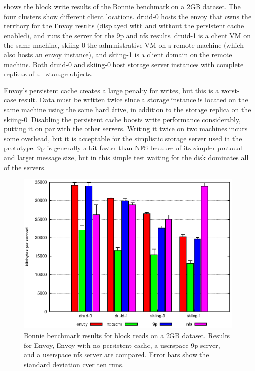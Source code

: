  shows the block write results of the Bonnie benchmark on a 2GB dataset. The four clusters show different client locations. druid-0 hosts the envoy that owns the territory for the Envoy results (displayed with and without the persistent cache enabled), and runs the server for the 9p and nfs results. druid-1 is a client VM on the same machine, skiing-0 the administrative VM on a remote machine (which also hosts an envoy instance), and skiing-1 is a client domain on the remote machine. Both druid-0 and skiing-0 host storage server instances with complete replicas of all storage objects.

Envoy's persistent cache creates a large penalty for writes, but this is a worst-case result. Data must be written twice since a storage instance is located on the same machine using the same hard drive, in addition to the storage replica on the skiing-0. Disabling the persistent cache boosts write performance considerably, putting it on par with the other servers. Writing it twice on two machines incurs some overhead, but it is acceptable for the simplistic storage server used in the prototype. 9p is generally a bit faster than NFS because of its simpler protocol and larger message size, but in this simple test waiting for the disk dominates all of the servers.

\begin{figure}[t]
\centering
\includegraphics[width=\figwidth]{figures/bonnie-read}
\caption[Bonnie benchmark results for block reads]{Bonnie benchmark results for block reads on a 2GB dataset. Results for Envoy, Envoy with no persistent cache, a userspace 9p server, and a userspace nfs server are compared. Error bars show the standard deviation over ten runs.}
\label{fig:bonnie-read}
\end{figure}

